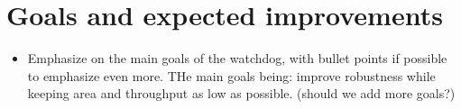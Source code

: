 \section{Goals and expected improvements}
\begin{itemize}
	\item Emphasize on the main goals of the watchdog, with bullet points if possible to emphasize even more. THe main goals being: improve robustness while keeping area and throughput as low as possible. (should we add more goals?)
\end{itemize}

